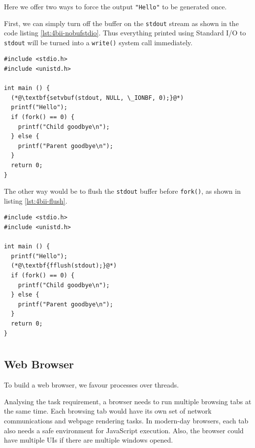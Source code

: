 \documentclass[12pt]{article}
\begin{document}
\subsubsection{}

Here we offer two ways to force the output \texttt{"Hello"} to be generated once.

First, we can simply turn off the buffer on the \texttt{stdout} stream as shown in the code listing \ref{lst:4bii-nobufstdio}. Thus everything printed using Standard I/O to \texttt{stdout} will be turned into a \texttt{write()} system call immediately. 

\begin{lstlisting}[style=C++, label={lst:4bii-nobufstdio}, caption={Turn off buffer for \texttt{stdout}},captionpos=b]
#include <stdio.h>
#include <unistd.h>

int main () {
  (*@\textbf{setvbuf(stdout, NULL, \_IONBF, 0);}@*)
  printf("Hello");
  if (fork() == 0) {
    printf("Child goodbye\n");
  } else {
    printf("Parent goodbye\n");
  }
  return 0;
}
\end{lstlisting}

The other way would be to flush the \texttt{stdout} buffer before \texttt{fork()}, as shown in listing \ref{lst:4bii-flush}.

\begin{lstlisting}[style=C++, label={lst:4bii-flush}, caption={Flush the \texttt{stdout} buffer before \texttt{fork}},captionpos=b]
#include <stdio.h>
#include <unistd.h>

int main () {
  printf("Hello");
  (*@\textbf{fflush(stdout);}@*)
  if (fork() == 0) {
    printf("Child goodbye\n");
  } else {
    printf("Parent goodbye\n");
  }
  return 0;
}
\end{lstlisting}


\newpage
\section{}

\subsection{Web Browser}
To build a web browser, we favour processes over threads.

Analysing the task requirement, a browser needs to run multiple browsing tabs at the same time. Each browsing tab would have its own set of network communications and webpage rendering tasks. In modern-day browsers, each tab also needs a safe environment for JavaScript execution. Also, the browser could have multiple UIs if there are multiple windows opened. 
\end{document}
